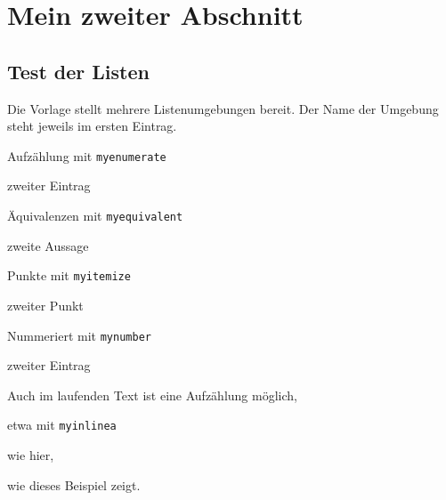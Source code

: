 
\section{Mein zweiter Abschnitt}\label{sec:zweiter-abschnitt}
\subsection{Test der Listen}\label{subsec:listen}
Die Vorlage stellt mehrere Listenumgebungen bereit.
Der Name der Umgebung steht jeweils im ersten Eintrag.
\begin{myenumerate}
\item
Aufzählung mit \verb|myenumerate|
\item
zweiter Eintrag
\end{myenumerate}
\begin{myequivalent}
\item
Äquivalenzen mit \verb|myequivalent|
\item
zweite Aussage
\end{myequivalent}
\begin{myitemize}
\item
Punkte mit \verb|myitemize|
\item
zweiter Punkt
\end{myitemize}
\begin{mynumber}
\item
Nummeriert mit \verb|mynumber|
\item
zweiter Eintrag
\end{mynumber}
Auch im laufenden Text ist eine Aufzählung möglich,
\begin{myinlinea}
\item
etwa mit \verb|myinlinea|
\item
wie hier,
\end{myinlinea}
wie dieses Beispiel zeigt.
